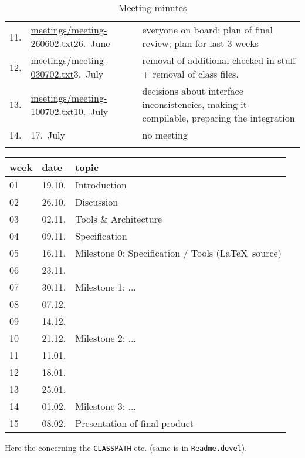 \begin{table}[htbp]
\begin{tabular}[t]{r@{\quad}l@{\quad\quad}p{9cm}}
    11. 
    &
    \url{meetings/meeting-260602.txt}{26.\ June}
    &
    everyone on board; plan of final review;
    plan for last 3 weeks
    \\
    12. 
    &
    \url{meetings/meeting-030702.txt}{3.\ July}
    &
    removal of additional checked in stuff +
    removal of class files.
    \\
    13. 
    &
    \url{meetings/meeting-100702.txt}{10.\ July}
    &
    decisions about interface inconsistencies,
    making it compilable, 
    preparing the integration
    \\
    14. 
    &
    17.\ July
    &
    no meeting
    \\
\fi
  \end{tabular}
    \caption{Meeting minutes}
    \label{tab:meetings}
  \end{table}



\begin{tabular}{|l|l|l|}
\hline
week & date & topic 
\\\hline
01 & 19.10. & Introduction\\
02 & 26.10. & Discussion\\
03 & 02.11. & Tools \& Architecture\\
04 & 09.11. & Specification\\
05 & 16.11. & {Milestone 0}: Specification / Tools (\LaTeX\ source)\\
06 & 23.11. &\\
07 & 30.11. &  {Milestone 1:} ...\\
08 & 07.12. &\\
09 & 14.12. &\\
10 & 21.12. & Milestone 2: ...\\
11 & 11.01. &\\
12 & 18.01. &\\
13 & 25.01. &\\
14 & 01.02. & Milestone 3: ...\\
15 & 08.02. & Presentation of final product\\
\hline
\end{tabular}






\iffalse
Here the  concerning the \texttt{CLASSPATH}
etc. (same is in \texttt{Readme.devel}).

